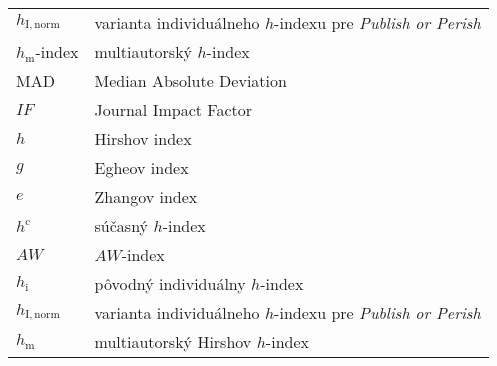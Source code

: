 \begin{flushleft}
\begin{longtable}[l]{ll}
    $h_{\mathrm{I, norm}}$ & varianta individuálneho $h$-indexu pre \emph{Publish or Perish}\\[1mm]
    $h_{\mathrm{m}}$-index & multiautorský $h$-index \\[1em]
    MAD                    & Median Absolute Deviation \\[1.5mm]
    $\mathit{IF}$          & Journal Impact Factor \\[1mm]
    $h$                    & Hirshov index \\[1mm]
    $g$                    & Egheov index \\[1mm]
    $e$                    & Zhangov index \\[1mm]
    $h^{\mathrm{c}}$       & súčasný $h$-index \\[1mm]
    $\mathit{AW}$          & $\mathit{AW}$-index \\[1mm]
    $h_{\mathrm{i}}$       & pôvodný individuálny $h$-index  \\[1mm]
    $h_{\mathrm{I, norm}}$ & varianta individuálneho $h$-indexu pre \emph{Publish or Perish}\\[1mm]
    $h_{\mathrm{m}}$       & multiautorský Hirshov $h$-index  \\[1mm]
  \end{longtable}
\end{flushleft}

